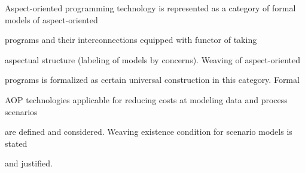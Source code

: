 Aspect-oriented programming technology is represented as a category of formal models of aspect-oriented 


programs and their interconnections equipped with functor of taking 


aspectual structure (labeling of models by concerns). Weaving of aspect-oriented 


programs is formalized as certain universal construction in this category. Formal 


AOP technologies applicable for reducing costs at modeling data and process scenarios 


are defined and considered. Weaving existence condition for scenario models is stated 


and justified.




























\def\tit{COGNITIVE INTEROPERABILITY OF~EXPERT COLLABORATION IN~THE~TASK 


OF~THE~RUSSIAN-FRENCH PARALLEL


TEXTS PROCESSING:\\ LINGUISTIC AND~COGNITIVE ASPECTS}





\def\aut{O.\,S.~Kozhunova}





\def\auf{IPI RAN, kozhunovka@mail.ru}








\def\leftkol{ENGLISH ABSTRACTS}





\def\rightkol{ENGLISH ABSTRACTS}





